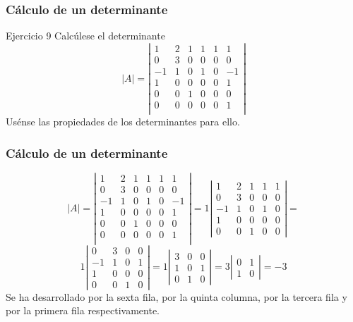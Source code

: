\documentclass[aspectratio=169]{beamer}
\begin{document}
\begin{frame}
  \frametitle{C\'alculo de un determinante}
     \begin{block}{Ejercicio 9}
Calc\'ulese el determinante
\[|A| = \left|\begin{array}{cccccc}1 & 2 & 1 &1&1&1 \\ 0 & 3 & 0 &0&0&0 \\ -1 & 1 & 0 &1&0&-1 \\
1 & 0 & 0 &0&0&1 \\ 0 & 0 &1 &0&0&0 \\  0 & 0 & 0 &0&0&1 \\ \end{array}\right|\]
Us\'ense las propiedades de los determinantes para ello.
\end{block}
\end{frame} 

\begin{frame}
  \frametitle{C\'alculo de un determinante}
\[|A| = \left|\begin{array}{cccccc}1 & 2 & 1 &1&1&1 \\ 0 & 3 & 0 &0&0&0 \\ -1 & 1 & 0 &1&0&-1 \\1 & 0 & 0 &0&0&1 \\ 0 & 0 &1 &0&0&0 \\  0 & 0 & 0 &0&0&1 \\ \end{array}\right| = 1\left|\begin{array}{ccccc}1 & 2 & 1 &1&1 \\ 0 & 3 & 0 &0&0 \\ -1 & 1 & 0 &1&0 \\1 & 0 & 0 &0&0 \\ 0 & 0 &1 &0&0 \end{array}\right| =\]\[ 1\left|\begin{array}{ccccc} 0 & 3 & 0 &0 \\ -1 & 1 & 0 &1 \\1 & 0 & 0 &0 \\ 0 & 0 &1 &0 \end{array}\right| = 1\left|\begin{array}{ccccc}  3 & 0 &0 \\  1 & 0 &1 \\ 0 &1 &0 \end{array}\right| = 3\left|\begin{array}{ccccc}   0 &1 \\ 1 &0 \end{array}\right| = -3 \]
Se ha desarrollado por la sexta fila, por la quinta columna, por la tercera fila y por la primera fila respectivamente.
\end{frame} 
\end{document}

